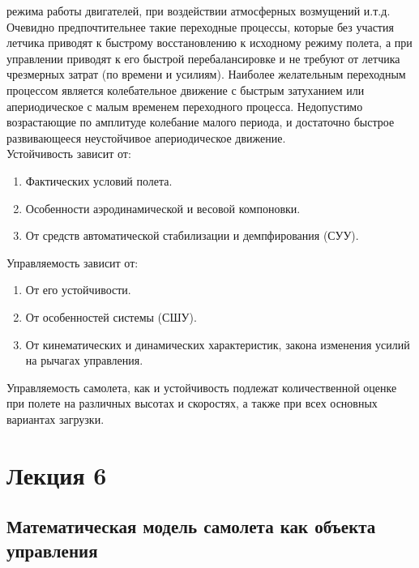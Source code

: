 \documentclass{article}
\begin{document}
режима работы двигателей, при воздействии атмосферных возмущений и.т.д.
Очевидно предпочтительнее такие переходные процессы, которые без участия
летчика приводят к быстрому восстановлению к исходному режиму полета, а при
управлении приводят к его быстрой перебалансировке и не требуют от летчика
чрезмерных затрат (по времени и усилиям). Наиболее желательным переходным
процессом является колебательное движение с быстрым затуханием или
апериодическое с малым временем переходного процесса. Недопустимо возрастающие
по амплитуде колебание малого периода, и достаточно быстрое развивающееся
неустойчивое апериодическое движение.\\
Устойчивость зависит от:
\begin{enumerate}
	\item Фактических условий полета.
	\item Особенности аэродинамической и весовой компоновки.
	\item От средств автоматической стабилизации и демпфирования (СУУ).
\end{enumerate}
Управляемость зависит от:
\begin{enumerate}
	\item От его устойчивости.
	\item От особенностей системы (СШУ).
	\item От кинематических и динамических характеристик, закона изменения
	      усилий на рычагах управления.
\end{enumerate}

Управляемость самолета, как и устойчивость подлежат количественной оценке при
полете на различных высотах и скоростях, а также при всех основных вариантах
загрузки.

\newpage
\section{Лекция 6}
\subsection{Математическая модель самолета как объекта управления}
\end{document}
